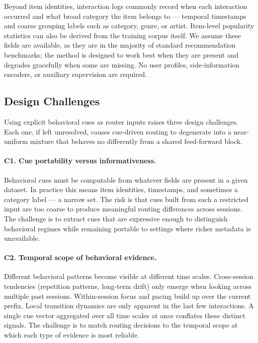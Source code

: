 \documentclass[sigconf,review,anonymous]{acmart}
\begin{document}
Beyond item identities, interaction logs commonly record when each interaction occurred and what broad category the item belongs to --- temporal timestamps and coarse grouping labels such as category, genre, or artist. Item-level popularity statistics can also be derived from the training corpus itself. We assume these fields are available, as they are in the majority of standard recommendation benchmarks; the method is designed to work best when they are present and degrades gracefully when some are missing. No user profiles, side-information encoders, or auxiliary supervision are required.

\subsection{Design Challenges}

Using explicit behavioral cues as router inputs raises three design challenges. Each one, if left unresolved, causes cue-driven routing to degenerate into a near-uniform mixture that behaves no differently from a shared feed-forward block.

\paragraph{\textbf{C1. Cue portability versus informativeness.}}
Behavioral cues must be computable from whatever fields are present in a given dataset. In practice this means item identities, timestamps, and sometimes a category label --- a narrow set. The risk is that cues built from such a restricted input are too coarse to produce meaningful routing differences across sessions. The challenge is to extract cues that are expressive enough to distinguish behavioral regimes while remaining portable to settings where richer metadata is unavailable.

\paragraph{\textbf{C2. Temporal scope of behavioral evidence.}}
Different behavioral patterns become visible at different time scales. Cross-session tendencies (repetition patterns, long-term drift) only emerge when looking across multiple past sessions. Within-session focus and pacing build up over the current prefix. Local transition dynamics are only apparent in the last few interactions. A single cue vector aggregated over all time scales at once conflates these distinct signals. The challenge is to match routing decisions to the temporal scope at which each type of evidence is most reliable.
\end{document}
